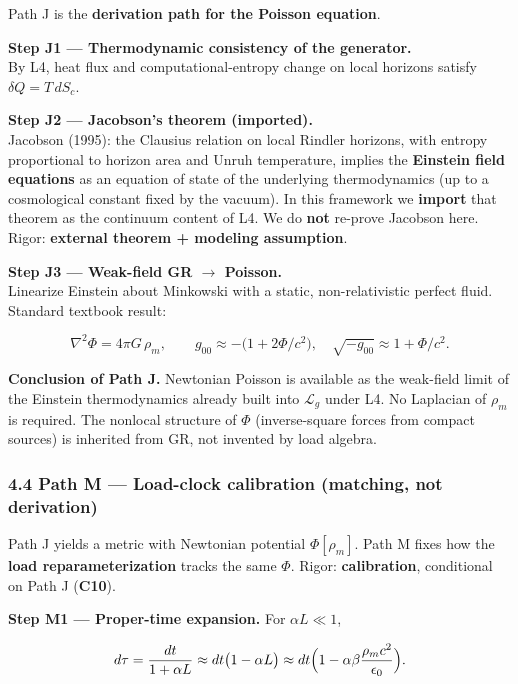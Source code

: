 \documentclass[
  11pt,
]{article}
\begin{document}
Path J is the \textbf{derivation path for the Poisson equation}.

\textbf{Step J1 --- Thermodynamic consistency of the generator.}\\
By L4, heat flux and computational-entropy change on local horizons
satisfy \(\delta Q=T\,dS_c\).

\textbf{Step J2 --- Jacobson's theorem (imported).}\\
Jacobson (1995): the Clausius relation on local Rindler horizons, with
entropy proportional to horizon area and Unruh temperature, implies the
\textbf{Einstein field equations} as an equation of state of the
underlying thermodynamics (up to a cosmological constant fixed by the
vacuum). In this framework we \textbf{import} that theorem as the
continuum content of L4. We do \textbf{not} re-prove Jacobson here.
Rigor: \textbf{external theorem + modeling assumption}.

\textbf{Step J3 --- Weak-field GR $\to$ Poisson.}\\
Linearize Einstein about Minkowski with a static, non-relativistic
perfect fluid. Standard textbook result:

\[
\nabla^2\Phi = 4\pi G\,\rho_m,
\qquad
g_{00} \approx -\bigl(1+2\Phi/c^2\bigr),
\quad
\sqrt{-g_{00}}\approx 1+\Phi/c^2.
\]

\textbf{Conclusion of Path J.} Newtonian Poisson is available as the
weak-field limit of the Einstein thermodynamics already built into
\(\mathcal{L}_g\) under L4. No Laplacian of \(\rho_m\) is required. The
nonlocal structure of \(\Phi\) (inverse-square forces from compact
sources) is inherited from GR, not invented by load algebra.

\subsubsection{4.4 Path M --- Load-clock calibration (matching, not
derivation)}\label{path-m-load-clock-calibration-matching-not-derivation}

Path J yields a metric with Newtonian potential \(\Phi[\rho_m]\). Path M
fixes how the \textbf{load reparameterization} tracks the same \(\Phi\).
Rigor: \textbf{calibration}, conditional on Path J (\textbf{C10}).

\textbf{Step M1 --- Proper-time expansion.} For \(\alpha L\ll 1\),

\[
d\tau
=
\frac{dt}{1+\alpha L}
\approx
dt\bigl(1-\alpha L\bigr)
\approx
dt\Bigl(1-\alpha\beta\frac{\rho_m c^2}{\epsilon_0}\Bigr).
\]
\end{document}
